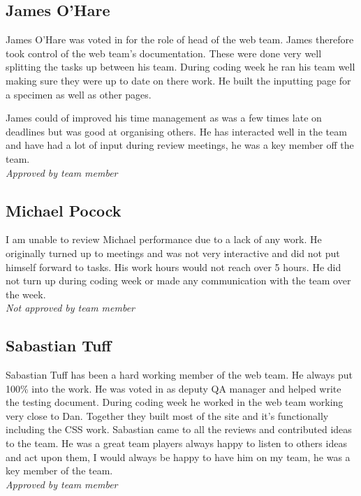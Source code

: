 \subsection{James O’Hare}
    James O’Hare was voted in for the role of head of the web team. James therefore took control of the web team's documentation. These were done very well splitting the tasks up between his team. During coding week he ran his team well making sure they were up to date on there work. He built the inputting page for a specimen as well as other pages. 
    
    James could of improved his time management as was a few times late on deadlines but was good at organising others. He has interacted well in the team and have had a lot of input during review meetings, he was a key member off the team.\\
    \emph{Approved by team member}

\subsection{Michael Pocock}
    I am unable to review Michael performance due to a lack of any work. He originally turned up to meetings and was not very interactive and did not put himself forward to tasks. His work hours would not reach over 5 hours. He did not turn up during coding week or made any communication with the team over the week.\\
    \emph{Not approved by team member}

\subsection{Sabastian Tuff}
    Sabastian Tuff has been a hard working member of the web team. He always put 100\% into the work. He was voted in as deputy QA manager and helped write the testing document.  During coding week he worked in the web team working very close to Dan. Together they built most of the site and it’s functionally including the CSS work. 
    Sabastian came to all the reviews and contributed ideas to the team. He was a great team players always happy to listen to others ideas and act upon them, I would always be happy to have him on my team, he was a key member of the team.\\
    \emph{Approved by team member}

